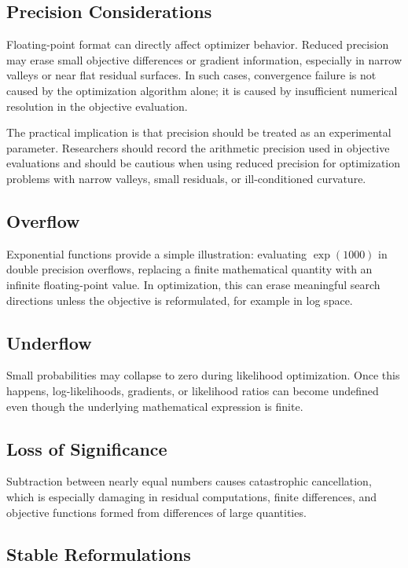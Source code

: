 \subsection{Precision Considerations}

Floating-point format can directly affect optimizer behavior. Reduced precision may erase small objective differences or gradient information, especially in narrow valleys or near flat residual surfaces. In such cases, convergence failure is not caused by the optimization algorithm alone; it is caused by insufficient numerical resolution in the objective evaluation.

The practical implication is that precision should be treated as an experimental parameter. Researchers should record the arithmetic precision used in objective evaluations and should be cautious when using reduced precision for optimization problems with narrow valleys, small residuals, or ill-conditioned curvature.

\subsection{Overflow}

Exponential functions provide a simple illustration: evaluating $\exp(1000)$ in double precision overflows, replacing a finite mathematical quantity with an infinite floating-point value. In optimization, this can erase meaningful search directions unless the objective is reformulated, for example in log space.

\subsection{Underflow}

Small probabilities may collapse to zero during likelihood optimization. Once this happens, log-likelihoods, gradients, or likelihood ratios can become undefined even though the underlying mathematical expression is finite.

\subsection{Loss of Significance}

Subtraction between nearly equal numbers causes catastrophic cancellation, which is especially damaging in residual computations, finite differences, and objective functions formed from differences of large quantities.

\subsection{Stable Reformulations}

